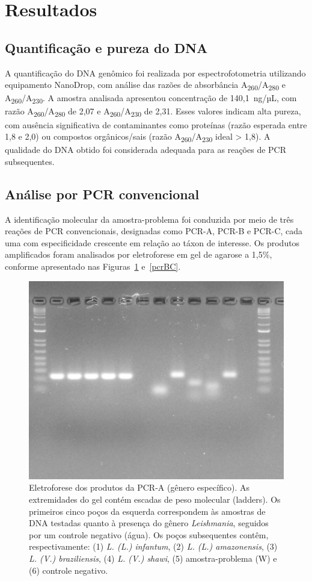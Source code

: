 \section{Resultados}

\subsection{Quantificação e pureza do DNA}
A quantificação do DNA genômico foi realizada por espectrofotometria utilizando equipamento NanoDrop, 
com análise das razões de absorbância A\textsubscript{260}/A\textsubscript{280} e A\textsubscript{260}/A\textsubscript{230}. 
A amostra analisada apresentou concentração de 140{,}1~ng/µL, com razão A\textsubscript{260}/A\textsubscript{280} de 2{,}07 e 
A\textsubscript{260}/A\textsubscript{230} de 2{,}31. Esses valores indicam alta pureza, com ausência significativa de contaminantes 
como proteínas (razão esperada entre 1{,}8 e 2{,}0) ou compostos orgânicos/sais (razão A\textsubscript{260}/A\textsubscript{230} 
ideal > 1{,}8)\cite{Alguém}. A qualidade do DNA obtido foi considerada adequada para as reações de PCR subsequentes.

\subsection{Análise por PCR convencional}
A identificação molecular da amostra-problema foi conduzida por meio de três reações de PCR convencionais, designadas como PCR-A, PCR-B 
e PCR-C, cada uma com especificidade crescente em relação ao táxon de interesse. Os produtos amplificados foram analisados por eletroforese 
em gel de agarose a 1{,}5\%, conforme apresentado nas Figuras~\ref{pcrA} e~\ref{pcrBC}.

\begin{figure}
 \centering
 \includegraphics[width=.4\textwidth]{fig/pcrA_rflp_g8}
 \caption{Eletroforese dos produtos da PCR-A (gênero específico). As extremidades do gel contém escadas de peso molecular (ladders). 
 Os primeiros cinco poços da esquerda correspondem às amostras de DNA testadas quanto à presença do gênero \textit{Leishmania}, 
 seguidos por um controle negativo (água). Os poços subsequentes contêm, respectivamente: (1) \textit{L. (L.) infantum}, 
 (2) \textit{L. (L.) amazonensis}, (3) \textit{L. (V.) braziliensis}, (4) \textit{L. (V.) shawi}, (5) amostra-problema (W) e (6) controle negativo.}
 \label{pcrA}
 \end{figure}

